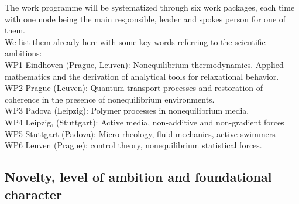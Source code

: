 The work programme will be systematized through six work packages, each time with one node being the main responsible, leader and spokes person for one of them.\\
We list them already here with some key-words referring to the scientific ambitions:\\
WP1 Eindhoven (Prague, Leuven): Nonequilibrium thermodynamics.  Applied mathematics and the derivation of analytical tools for relaxational behavior.\\
WP2 Prague (Leuven): Quantum transport processes and restoration of coherence in the presence of nonequilibrium environments.\\
WP3 Padova (Leipzig): Polymer processes in nonequilibrium media.\\
WP4 Leipzig, (Stuttgart):  Active media, non-additive and non-gradient forces\\
WP5 Stuttgart (Padova): Micro-rheology, fluid mechanics, active swimmers\\
WP6 Leuven (Prague): control theory, nonequilibrium statistical forces.\\

\subsection{Novelty, level of ambition and foundational character}\label{sec:progress}


